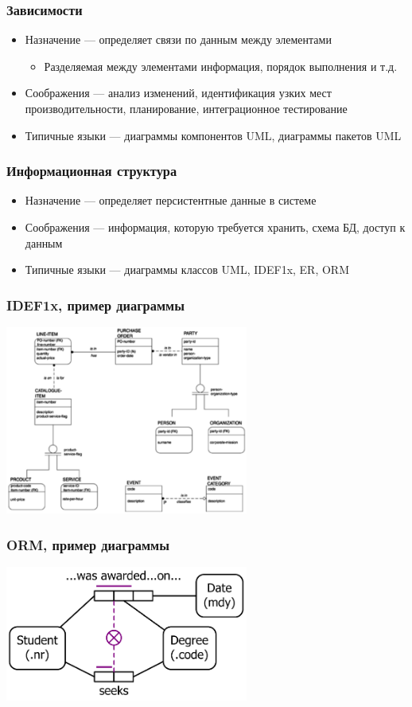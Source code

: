 \documentclass[xetex,mathserif,serif]{beamer}
\begin{document}
	\begin{frame}
		\frametitle{Зависимости}
		\begin{itemize}
			\item Назначение --- определяет связи по данным между элементами
			\begin{itemize}
				\item Разделяемая между элементами информация, порядок выполнения и т.д.
			\end{itemize}
			\item Соображения --- анализ изменений, идентификация узких мест производительности, планирование, интеграционное тестирование
			\item Типичные языки --- диаграммы компонентов UML, диаграммы пакетов UML
		\end{itemize}
	\end{frame}

	\begin{frame}
		\frametitle{Информационная структура}
		\begin{itemize}
			\item Назначение --- определяет персистентные данные в системе
			\item Соображения --- информация, которую требуется хранить, схема БД, доступ к данным
			\item Типичные языки --- диаграммы классов UML, IDEF1x, ER, ORM
		\end{itemize}
	\end{frame}

	\begin{frame}
		\frametitle{IDEF1x, пример диаграммы}
		\begin{center}
			\includegraphics[width=0.6\textwidth]{idef1x.png}
		\end{center}
	\end{frame}

	\begin{frame}
		\frametitle{ORM, пример диаграммы}
		\begin{center}
			\includegraphics[width=0.6\textwidth]{orm.png}
		\end{center}
	\end{frame}
\end{document}
